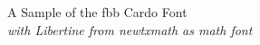 \documentclass[11pt]{article}
\begin{document}
{\LARGE \noindent A Sample of the fbb Cardo Font}\\

{\large \noindent \textit{with Libertine from newtxmath as math font}}\\[5pt]


\end{document}
